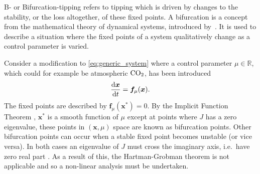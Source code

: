 B- or Bifurcation-tipping refers to tipping which is driven by changes to the stability, or the loss altogether, of these fixed points.
A bifurcation is a concept from the mathematical theory of dynamical systems, introduced by~\cite{Poincare1885}.
It is used to describe a situation where the fixed points of a system qualitatively change as a control parameter is varied.

Consider a modification to \cref{eq:generic_system} where a control parameter $\mu \in \mathbb{R}$, which could for example be atmospheric $\ce{CO2}$, has been introduced
\begin{equation}
  \label{eq:generic_system_control_parameter}
  \dv{\bm{x}}{t} = \bm{f}_{\mu}(\bm{x}).
\end{equation}
The fixed points are described by $\bm{f}_{\mu}(\bm{x}^*) = 0$. By the Implicit Function Theorem \parencite{Spivak1965}, $\bm{x}^*$ is a smooth
function of $\mu$ except at points where $J$ has a zero eigenvalue, these points in $(\bm{x},\mu)$ space are known as bifurcation points.
Other bifurcation points can occur when a stable fixed point becomes unstable (or vice versa). In both cases an eigenvalue of $J$ must cross the imaginary
axis, i.e.\ have zero real part \parencite{guckenheimer2013}. As a result of this, the Hartman-Grobman theorem is not applicable and so a non-linear analysis must be undertaken.

